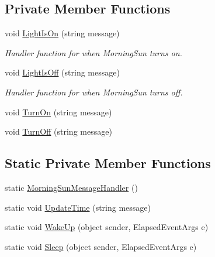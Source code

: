\subsection*{Private Member Functions}
\begin{DoxyCompactItemize}
\item 
void \mbox{\hyperlink{class_master_application_1_1_message_handlers_1_1_morning_sun_message_handler_abf6716f193dc5a3a3cdc97a31fb33575}{Light\+Is\+On}} (string message)
\begin{DoxyCompactList}\small\item\em Handler function for when Morning\+Sun turns on. \end{DoxyCompactList}\item 
void \mbox{\hyperlink{class_master_application_1_1_message_handlers_1_1_morning_sun_message_handler_a526dcd561059dfe79f2f0ba862b69561}{Light\+Is\+Off}} (string message)
\begin{DoxyCompactList}\small\item\em Handler function for when Morning\+Sun turns off. \end{DoxyCompactList}\item 
void \mbox{\hyperlink{class_master_application_1_1_message_handlers_1_1_morning_sun_message_handler_af575f6b6c9bc931599f02c1858903b2b}{Turn\+On}} (string message)
\item 
void \mbox{\hyperlink{class_master_application_1_1_message_handlers_1_1_morning_sun_message_handler_aa719d01ca3e96dae506e467da4bb40df}{Turn\+Off}} (string message)
\end{DoxyCompactItemize}
\subsection*{Static Private Member Functions}
\begin{DoxyCompactItemize}
\item 
static \mbox{\hyperlink{class_master_application_1_1_message_handlers_1_1_morning_sun_message_handler_ac4e1e473b2e8f7ae2f8bf1b5d6059e6b}{Morning\+Sun\+Message\+Handler}} ()
\item 
static void \mbox{\hyperlink{class_master_application_1_1_message_handlers_1_1_morning_sun_message_handler_a1c51cc86793ded7228b52ea28e1c08da}{Update\+Time}} (string message)
\item 
static void \mbox{\hyperlink{class_master_application_1_1_message_handlers_1_1_morning_sun_message_handler_aef59514a029ee21e09daae1802785a17}{Wake\+Up}} (object sender, Elapsed\+Event\+Args e)
\item 
static void \mbox{\hyperlink{class_master_application_1_1_message_handlers_1_1_morning_sun_message_handler_a87c7d58728ce4087b929a28ac2f07812}{Sleep}} (object sender, Elapsed\+Event\+Args e)
\end{DoxyCompactItemize}
